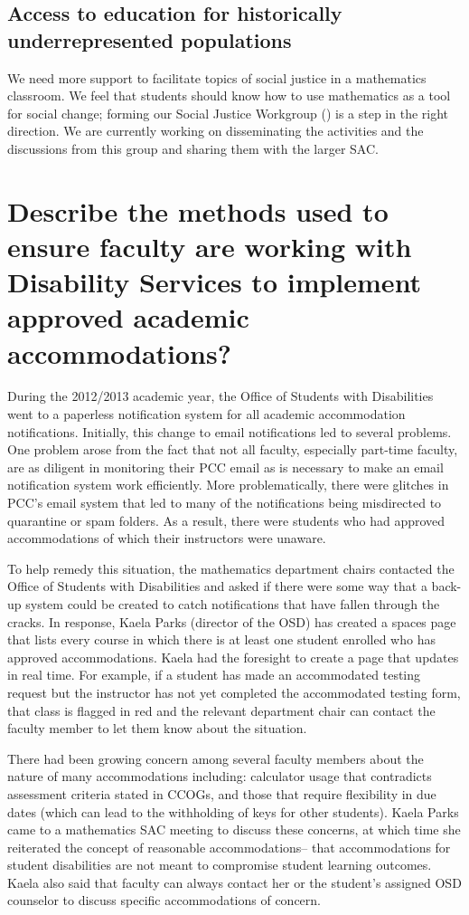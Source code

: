\subsection{Access to education for historically underrepresented populations}
We need more support to facilitate topics of social justice in a mathematics classroom. We
feel that students should know how to use mathematics as a tool for social
change; forming our Social Justice Workgroup () is
a step in the right direction. We are currently working on disseminating the activities and the discussions from this
group and sharing them with the larger SAC.

\section[Approved academic accommodations]{Describe the methods used to ensure faculty are working with Disability Services to implement approved academic accommodations?}
During the 2012/2013 academic year, the Office of Students with Disabilities
went to a paperless notification system for all academic accommodation
notifications.  Initially, this change to email notifications led to several
problems.  One problem arose from the fact that not all faculty, especially
part-time faculty, are as diligent in monitoring their PCC email as is
necessary to make an email notification system work efficiently.  More
problematically, there were glitches in PCC's email system that led to many of the
notifications being misdirected to quarantine or spam folders.  As a result,
there were students who had approved accommodations of which their instructors
were unaware.

To help remedy this situation, the mathematics department chairs contacted the
Office of Students with Disabilities and asked if there were some way that a
back-up system could be created to catch notifications that have fallen through
the cracks.  In response, Kaela Parks (director of the OSD) has created a
spaces page that lists every course in which there is at least one student
enrolled who has approved accommodations.  Kaela had the foresight to create a
page that updates in real time.  For example, if a student has made an
accommodated testing request but the instructor has not yet completed the
accommodated testing form, that class is flagged in red and the relevant
department chair can contact the faculty member to let them know about the
situation.

There had been growing concern among several faculty members
about the nature of many accommodations including:  calculator usage that
contradicts assessment criteria stated in CCOGs, and  those that require flexibility
in due dates (which can lead to the withholding of keys for other students).  Kaela Parks came to a mathematics SAC
meeting to discuss these concerns, at which time she reiterated the concept of
reasonable accommodations-- that accommodations for student disabilities are not
meant to compromise student learning outcomes.
Kaela also said that
faculty can always contact her or the student's assigned OSD counselor to
discuss specific accommodations of concern.

